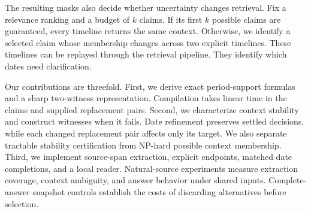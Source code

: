 The resulting masks also decide whether uncertainty changes retrieval.
Fix a relevance ranking and a budget of $k$ claims.
If its first $k$ possible claims are guaranteed, every timeline returns the same context.
Otherwise, we identify a selected claim whose membership changes across two explicit timelines.
These timelines can be replayed through the retrieval pipeline.
They identify which dates need clarification.

Our contributions are threefold.
First, we derive exact period-support formulas and a sharp two-witness representation.
Compilation takes linear time in the claims and supplied replacement pairs.
Second, we characterize context stability and construct witnesses when it fails.
Date refinement preserves settled decisions, while each changed replacement pair affects only its target.
We also separate tractable stability certification from NP-hard possible context membership.
Third, we implement source-span extraction, explicit endpoints, matched date completions, and a local reader.
Natural-source experiments measure extraction coverage, context ambiguity, and answer behavior under shared inputs.
Complete-answer snapshot controls establish the costs of discarding alternatives before selection.
